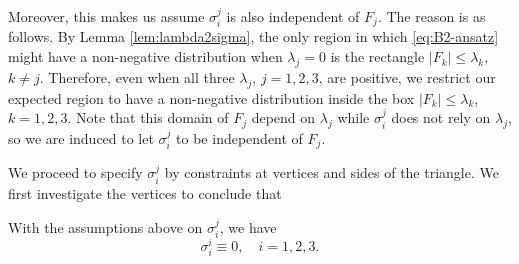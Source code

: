 Moreover, this makes us assume $\sigma_i^j$ is also independent of $F_j$.
The reason is as follows. By Lemma \ref{lem:lambda2sigma}, the only region
in which \eqref{eq:B2-ansatz} might have a non-negative distribution when
$\lambda_j = 0$ is the rectangle $|F_k| \leq \lambda_k$, $k \neq j$.
Therefore, even when all three $\lambda_j$, $j = 1,2,3$, are positive,
we restrict our expected region to have a non-negative distribution 
inside the box $|F_k| \leq \lambda_k$, $k = 1,2,3$. Note that
this domain of $F_j$ depend on $\lambda_j$ while
$\sigma_i^j$ does not rely on $\lambda_j$, so we are induced to let 
$\sigma_i^j$ to be independent of $F_j$.

We proceed to specify $\sigma^j_i$ by constraints at vertices and
sides of the triangle. We first investigate the vertices to conclude
that
\begin{lemma}
With the assumptions above on $\sigma_i^j$, we have
\[
\sigma_i^i \equiv 0, \quad i = 1,2,3.
\]
\end{lemma}
